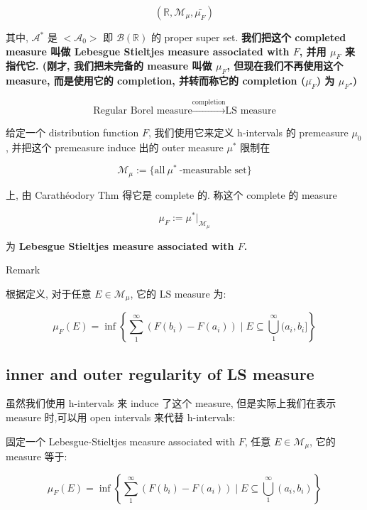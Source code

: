 \[(\mathbb{R},\mathcal{M}_{\mu},\bar{\mu_{F}})\]

其中, \(\mathcal{A}^{\ast}\) 是 \(< \mathcal{A}_{0} >\) 即 \(\mathcal{B}(\mathbb{R})\) 的 proper super set. \textbf{我们把这个 completed measure 叫做 Lebesgue Stieltjes measure associated with \(F\), 并用 \(\mu_{F}\) 来指代它. (刚才, 我们把未完备的 measure 叫做 \(\mu_{F}\), 但现在我们不再使用这个 measure, 而是使用它的 completion, 并转而称它的 completion (\(\bar{\mu_{F}}\)) 为 \(\mu_{F}\).)}

\[\text{Regular Borel measure}\overset{\text{completion}}{\rightarrow}\text{LS measure}\]

\begin{definition}{}

给定一个 distribution function \(F\), 我们使用它来定义 h-intervals 的 premeasure \(\mu_{0}\), 并把这个 premeasure induce 出的 outer measure \(\mu^{\ast}\) 限制在

\[\mathcal{M}_{\mu} := \{\text{all}\ \mu^{\ast}\ \text{-measurable set\}}\]

上, 由 Carathéodory Thm 得它是 complete 的. 称这个 complete 的 measure

\[\mu_{F} := \mu^{\ast}|_{\mathcal{M}_{\mu}}\]

为 \textbf{Lebesgue Stieltjes measure associated with \(F\).}

\end{definition}

\begin{qlremark}{Remark}

根据定义, 对于任意 \(E \in \mathcal{M}_{\mu}\), 它的 LS measure 为:

\[\mu_{F}(E) = \inf\left\{ {\sum\limits_{1}^{\infty}(F(b_{i}) - F(a_{i})) \mid E \subseteq \bigcup\limits_{1}^{\infty}(a_{i},b_{i}\rbrack} \right\}\]

\end{qlremark}

\subsection{inner and outer regularity of LS measure}\label{inner-and-outer-regularity-of-ls-measure}

虽然我们使用 h-intervals 来 induce 了这个 measure, 但是实际上我们在表示 measure 时,可以用 open intervals 来代替 h-intervals:

\begin{lemma}{}

固定一个 Lebesgue-Stieltjes measure associated with \(F\), 任意 \(E \in \mathcal{M}_{\mu}\), 它的 measure 等于:

\[\mu_{F}(E) = \inf\left\{ {\sum\limits_{1}^{\infty}(F(b_{i}) - F(a_{i})) \mid E \subseteq \bigcup\limits_{1}^{\infty}(a_{i},b_{i})} \right\}\]

\end{lemma}

